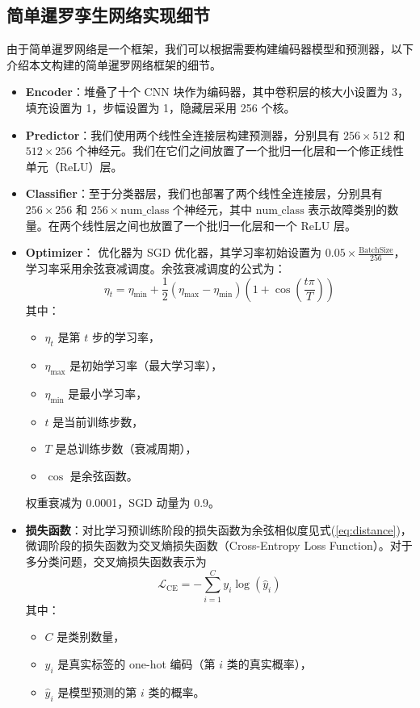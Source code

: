 \documentclass[master]{thesis-uestc}
\begin{document}
\subsection{简单暹罗孪生网络实现细节}
由于简单暹罗网络是一个框架，我们可以根据需要构建编码器模型和预测器，以下介绍本文构建的简单暹罗网络框架的细节。
\begin{itemize}
    \item \textbf{Encoder}：堆叠了十个 CNN 块作为编码器，其中卷积层的核大小设置为 3，填充设置为 1，步幅设置为 1，隐藏层采用 256 个核。
    
    \item \textbf{Predictor}：我们使用两个线性全连接层构建预测器，分别具有 \( 256 \times 512 \) 和 \( 512 \times 256 \) 个神经元。我们在它们之间放置了一个批归一化层和一个修正线性单元（ReLU）层。

    \item \textbf{Classifier}：至于分类器层，我们也部署了两个线性全连接层，分别具有 \( 256 \times 256 \) 和 \( 256 \times \text{num\_class} \) 个神经元，其中 \(\text{num\_class}\) 表示故障类别的数量。在两个线性层之间也放置了一个批归一化层和一个 ReLU 层。

    \item \textbf{Optimizer}：
        优化器为 SGD 优化器，其学习率初始设置为 \( 0.05 \times \frac{\text{BatchSize}}{256} \)，学习率采用余弦衰减调度。余弦衰减调度的公式为：
        \[
        \eta_t = \eta_{\text{min}} + \frac{1}{2} (\eta_{\text{max}} - \eta_{\text{min}}) \left(1 + \cos\left(\frac{t \pi}{T}\right)\right)
        \]
        其中：
        \begin{itemize}
            \item \(\eta_t\) 是第 \(t\) 步的学习率，
            \item \(\eta_{\text{max}}\) 是初始学习率（最大学习率），
            \item \(\eta_{\text{min}}\) 是最小学习率，
            \item \(t\) 是当前训练步数，
            \item \(T\) 是总训练步数（衰减周期），
            \item \(\cos\) 是余弦函数。
        \end{itemize}
        权重衰减为 0.0001，SGD 动量为 0.9。

    \item \textbf{损失函数}：对比学习预训练阶段的损失函数为余弦相似度见式(\ref{eq:distance})，微调阶段的损失函数为交叉熵损失函数（Cross-Entropy Loss Function）。对于多分类问题，交叉熵损失函数表示为
    \begin{equation}
        \mathcal{L}_{\text{CE}} = -\sum_{i=1}^{C} y_i \log(\hat{y}_i)
        \end{equation}        
        其中：
        \begin{itemize}
            \item \( C \) 是类别数量，
            \item \( y_i \) 是真实标签的 one-hot 编码（第 \( i \) 类的真实概率），
            \item \( \hat{y}_i \) 是模型预测的第 \( i \) 类的概率。
        \end{itemize}


\end{itemize}
\end{document}
